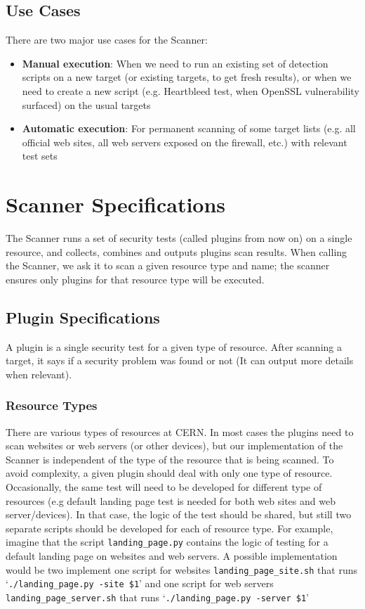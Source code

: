 \subsection{Use Cases}
There are two major use cases for the Scanner:
\begin{itemize}
\item \textbf{Manual execution}: When we need to run an existing set of detection scripts on a new target (or existing targets, to get fresh results), or when we need to create a new script (e.g. Heartbleed test, when OpenSSL vulnerability surfaced) on the usual targets
\item \textbf{Automatic execution}: For permanent scanning of some target lists (e.g. all official web sites, all web servers exposed on the firewall, etc.) with relevant test sets
\end{itemize}

\section{Scanner Specifications}

The Scanner runs a set of security tests (called plugins from now on) on a single resource, and collects, combines and outputs plugins scan results. When calling the Scanner, we ask it to scan a given resource type and name; the scanner ensures only plugins for that resource type will be executed. 

\subsection{Plugin Specifications}
A plugin is a single security test for a given type of resource. After scanning a target, it says if a security problem was found or not (It can output more details when relevant). 
\subsubsection{Resource Types}
There are various types of resources at CERN. In most cases the plugins need to scan websites or web servers (or other devices), but our implementation of the Scanner is independent of the type of the resource that is being scanned. To avoid complexity, a given plugin should deal with only one type of resource. Occasionally, the same test will need to be developed for different type of resources (e.g default landing page test is needed for both web sites and web server/devices). In that case, the logic of the test should be shared, but still two separate scripts should be developed for each of resource type. For example, imagine that the script \texttt{landing\_page.py} contains the logic of testing for a default landing page on websites and web servers. A possible implementation would be two implement one script for websites \texttt{landing\_page\_site.sh} that runs `\texttt{./landing\_page.py -site \$1}' and one script for web servers \texttt{landing\_page\_server.sh} that runs `\texttt{./landing\_page.py -server \$1}' 
